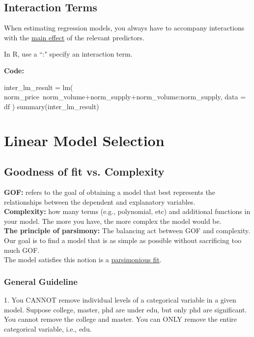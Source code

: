 \documentclass[12pt]{article}
\begin{document}
\subsection{Interaction Terms}

When estimating regression models, you always have to accompany 
interactions with the {\underline {main effect}} of the relevant
predictors.

In R, use a ``:"  specify an interaction term.

{\textbf {Code:}}

\begin{rc}
inter_lm_result = lm(
		norm_price~norm_volume+norm_supply+norm_volume:norm_supply,
		data = df
)
summary(inter_lm_result)
\end{rc}





\section{Linear Model Selection}

\subsection{Goodness of fit vs. Complexity}
{\textbf {GOF:}} refers to the goal of obtaining a model that best 
represents the relationships between the dependent and explanatory 
variables.\\

{\textbf {Complexity: }} how many terms (e.g., polynomial, etc) and
additional functions in your model. The more you have, the more 
complex the model would be.\\


{\textbf {The principle of parsimony:}} 
The balancing act between GOF and complexity.\\
Our goal is to find a model that is as simple as possible without
sacrificing too much GOF.\\
The model satisfies this notion is a {\underline {parsimonious fit}}.





\subsubsection{General Guideline}

1. You CANNOT remove individual levels of a categorical variable in 
a given model. Suppose college, master, phd are under edu, but only
phd are significant. You cannot remove the college and master. 
You can ONLY remove the entire categorical variable, i.e., edu.\\
\end{document}
